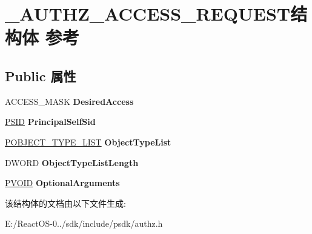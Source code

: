 \hypertarget{struct___a_u_t_h_z___a_c_c_e_s_s___r_e_q_u_e_s_t}{}\section{\+\_\+\+A\+U\+T\+H\+Z\+\_\+\+A\+C\+C\+E\+S\+S\+\_\+\+R\+E\+Q\+U\+E\+S\+T结构体 参考}
\label{struct___a_u_t_h_z___a_c_c_e_s_s___r_e_q_u_e_s_t}
\subsection*{Public 属性}
\begin{DoxyCompactItemize}
\item 
\mbox{\label{struct___a_u_t_h_z___a_c_c_e_s_s___r_e_q_u_e_s_t_a8aeda8d1770ae6b286479ebb0a67eb6a}} 
A\+C\+C\+E\+S\+S\+\_\+\+M\+A\+SK {\bfseries Desired\+Access}
\item 
\mbox{\label{struct___a_u_t_h_z___a_c_c_e_s_s___r_e_q_u_e_s_t_a9a56e5de2d2df7f53050deef40c35a0d}} 
\hyperlink{struct___s_i_d}{P\+S\+ID} {\bfseries Principal\+Self\+Sid}
\item 
\mbox{\label{struct___a_u_t_h_z___a_c_c_e_s_s___r_e_q_u_e_s_t_a72da6c73c0c8a02d05f07d6e56ef68a4}} 
\hyperlink{struct___o_b_j_e_c_t___t_y_p_e___l_i_s_t}{P\+O\+B\+J\+E\+C\+T\+\_\+\+T\+Y\+P\+E\+\_\+\+L\+I\+ST} {\bfseries Object\+Type\+List}
\item 
\mbox{\label{struct___a_u_t_h_z___a_c_c_e_s_s___r_e_q_u_e_s_t_ae157d22e75bb2a893726484dd56ab0b1}} 
D\+W\+O\+RD {\bfseries Object\+Type\+List\+Length}
\item 
\mbox{\label{struct___a_u_t_h_z___a_c_c_e_s_s___r_e_q_u_e_s_t_a84d7c4d577e66ac98444618f4dc6f097}} 
\hyperlink{interfacevoid}{P\+V\+O\+ID} {\bfseries Optional\+Arguments}
\end{DoxyCompactItemize}


该结构体的文档由以下文件生成\+:\begin{DoxyCompactItemize}
\item 
E\+:/\+React\+O\+S-\/0../sdk/include/psdk/authz.\+h\end{DoxyCompactItemize}
